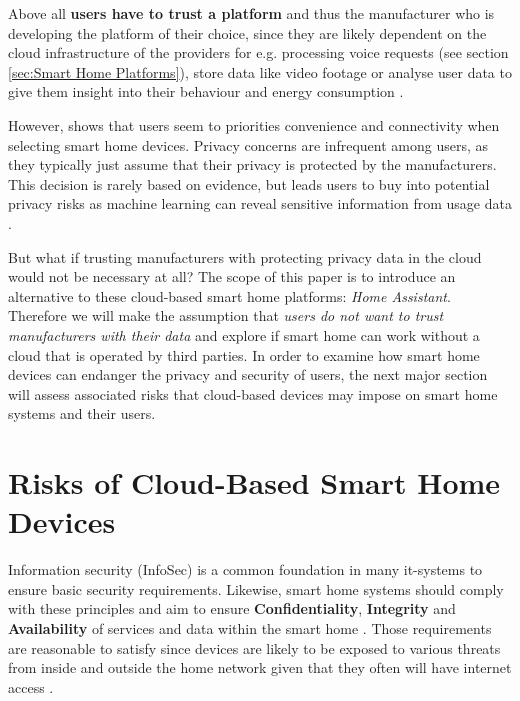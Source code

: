 Above all \textbf{users have to trust a platform} and thus the manufacturer who is developing the platform of their choice, since they are likely dependent on the cloud infrastructure of the providers for e.g. processing voice requests (see section \ref{sec:Smart Home Platforms}), store data like video footage \cite{Kastrenakes2019HKSC} or analyse user data to give them insight into their behaviour \cite{Liao2018AH} and energy consumption \cite{SamsungSmartThingsEnergy}.

However, \cite{ZhengSerena2018UPoS} shows that users seem to priorities convenience and connectivity when selecting smart home devices. Privacy concerns are infrequent among users, as they typically just assume that their privacy is protected by the manufacturers. This decision is rarely based on evidence, but leads users to buy into potential privacy risks as machine learning can reveal sensitive information from usage data \cite{ZhengSerena2018UPoS}.

But what if trusting manufacturers with protecting privacy data in the cloud would not be necessary at all? The scope of this paper is to introduce an alternative to these cloud-based smart home platforms: \textit{Home Assistant}. Therefore we will make the assumption that \textit{users do not want to trust manufacturers with their data} and explore if smart home can work without a cloud that is operated by third parties. In order to examine how smart home devices can endanger the privacy and security of users, the next major section will assess associated risks that cloud-based devices may impose on smart home systems and their users.

\newpage


\section{Risks of Cloud-Based Smart Home Devices}
Information security (InfoSec) is a common foundation in many it-systems to ensure basic security requirements. Likewise, smart home systems should comply with these principles and aim to ensure \textbf{Confidentiality}, \textbf{Integrity} and \textbf{Availability} of services and data within the smart home \cite{SecurityConsiderations-7354752}. Those requirements are reasonable to satisfy since devices are likely to be exposed to various threats from inside and outside the home network given that they often will have internet access \cite{SecurityConsiderations-7354752}.

